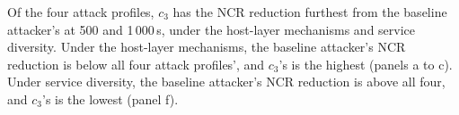 \documentclass{cshonours}
\newcommand{\prelim}[1]{#1}
\begin{document}
Of the four attack profiles, $c_3$ has the NCR reduction furthest from the
baseline attacker's at \prelim{500} and \prelim{1\,000}\,s, under the
host-layer mechanisms and service diversity. Under the host-layer mechanisms,
the baseline attacker's NCR reduction is below all four attack profiles', and
$c_3$'s is the highest (panels a to c). Under service diversity, the baseline
attacker's NCR reduction is above all four, and $c_3$'s is the lowest
(panel f).
\end{document}
